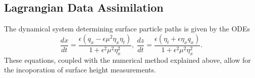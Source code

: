 

\subsection*{Lagrangian Data Assimilation}
The dynamical system determining surface particle paths is given by the ODEs
\[
\frac{dx}{dt} = \frac{\epsilon\left(q_{x}-\epsilon\mu^{2}\eta_{x}\eta_{t}\right)}{1 + \epsilon^{2}\mu^{2}\eta_{x}^{2}}, ~ \frac{dz}{dt} = \frac{\epsilon\left(\eta_{t}+\epsilon \eta_{x} q_{x}\right)}{1 + \epsilon^{2}\mu^{2}\eta_{x}^{2}}. 
\]
These equations, coupled with the numerical method explained above, allow for the incoporation of surface height measurements.  